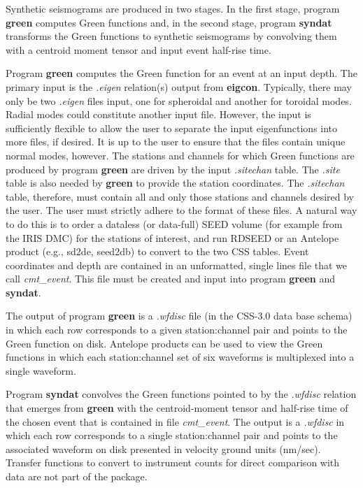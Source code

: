 \documentclass[11pt]{article}
\begin{document}
Synthetic seismograms are produced in two stages. In the first stage, program {\bf green}
computes Green functions and, in the second stage, program {\bf syndat}
transforms the Green functions to synthetic seismograms by convolving them with
a centroid moment tensor and input event half-rise time.

Program {\bf green} computes the Green function for an event at an input depth.
The primary input is the {\it .eigen} relation(s) output
from {\bf eigcon}. Typically, there may only be two {\it .eigen} files
input, one for spheroidal and another for toroidal modes. Radial modes
could constitute another input file. However, the input is sufficiently
flexible to allow the user to separate the input eigenfunctions into more
files, if desired. It is up to the user to ensure that the files contain
unique normal modes, however.
The stations and channels for which Green functions are produced by
program {\bf green} are driven by the input {\it .sitechan} table. The
{\it .site} table is also needed by {\bf green} to provide
the station coordinates. The {\it .sitechan} table, therefore,
must contain all and only those stations and channels desired by the user.
The user must strictly adhere to the format of these files. A natural way
to do this is to order a dataless (or data-full) SEED volume (for example
from the IRIS DMC) for the stations of interest, and run RDSEED or an Antelope product
(e.g., sd2de, seed2db) to convert to the two CSS tables. Event coordinates and depth
are contained in an unformatted, single lines file that we call {\it cmt\_event}.
This file must be created and input into program {\bf green} and {\bf syndat}.

The output of program {\bf green} is a {\it .wfdisc} file (in the CSS-3.0
data base schema) in which each row corresponds
to a given station:channel pair and points to the Green function on disk. Antelope
products can be used to view the Green functions in which each
station:channel set of six waveforms is multiplexed into
a single waveform.

Program {\bf syndat} convolves the Green functions pointed to
by the {\it .wfdisc} relation that emerges from {\bf green}
with the centroid-moment tensor and half-rise time of the chosen
event that is contained in file {\it cmt\_event}. The output
is a {\it .wfdisc} in which each row corresponds to a single
station:channel pair and points to the associated waveform on disk presented
in velocity ground units (nm/sec). Transfer functions to convert
to instrument counts for direct comparison with data are not part
of the package.
\end{document}
